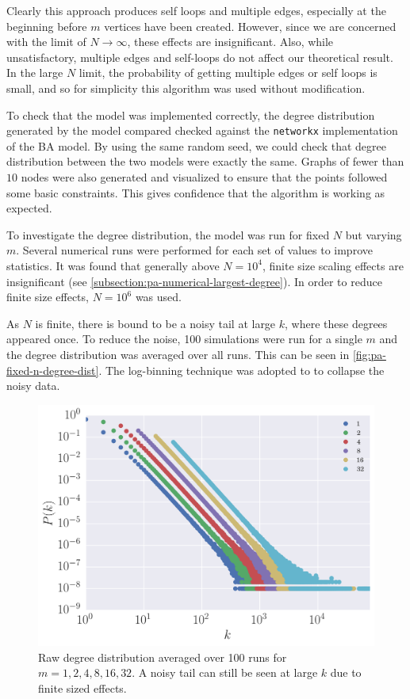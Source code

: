 Clearly this approach produces self loops and multiple edges, especially at the beginning before $m$ vertices have been created. However, since we are concerned with the limit of $N \rightarrow \infty$, these effects are insignificant. Also, while unsatisfactory, multiple edges and self-loops do not affect our theoretical result. In the large $N$ limit, the probability of getting multiple edges or self loops is small, and so for simplicity this algorithm was used without modification. 

To check that the model was implemented correctly, the degree distribution generated by the model compared checked against the \texttt{networkx} implementation of the BA model. By using the same random seed, we could check that degree distribution between the two models were exactly the same. Graphs of fewer than $10$ nodes were also generated and visualized to ensure that the points followed some basic constraints. This gives confidence that the algorithm is working as expected. 

To investigate the degree distribution, the model was run for fixed $N$ but varying $m$. Several numerical runs were performed for each set of values to improve statistics. It was found that generally above $N=10^4$, finite size scaling effects are insignificant (see \autoref{subsection:pa-numerical-largest-degree}). In order to reduce finite size effects, $N=10^6$ was used. 

As $N$ is finite, there is bound to be a noisy tail at large $k$, where these degrees appeared once. To reduce the noise, 100 simulations were run for a single $m$ and the degree distribution was averaged over all runs. This can be seen in \autoref{fig:pa-fixed-n-degree-dist}. The log-binning technique \citep{Christensen:2005} was adopted to to collapse the noisy data. 

\begin{figure}
    \centering
    \includegraphics[height=0.5\linewidth]{img/pa-fixed-n-degree-dist}
    \caption{Raw degree distribution averaged over 100 runs for $m = 1, 2, 4, 8, 16, 32$. A noisy tail can still be seen at large $k$ due to finite sized effects. }
    \label{fig:pa-fixed-n-degree-dist}
\end{figure}


